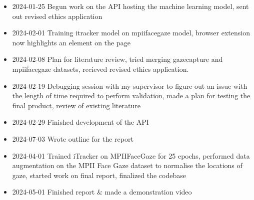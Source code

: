 \documentclass{report}
\begin{document}
\begin{itemize}
    \item 2024-01-25 Begun work on the API hosting the machine learning model, sent out revised ethics application 
    \item 2024-02-01 Training itracker model on mpiifacegaze model, browser extension now highlights an element on the page 
    \item 2024-02-08 Plan for literature review, tried merging gazecapture and mpiifacegaze datasets, recieved revised ethics application. 
    \item 2024-02-19 Debugging session with my supervisor to figure out an issue with the length of time required to perform validation, made a plan for testing the final product, review of existing literature 
    \item 2024-02-29 Finished development of the API 
    \item 2024-07-03 Wrote outline for the report
    \item 2024-04-01 Trained iTracker on MPIIFaceGaze for 25 epochs, performed data augmentation on the MPII Face Gaze dataset to normalise the locations of gaze, started work on final report, finalized the codebase 
    \item 2024-05-01 Finished report \& made a demonstration video 
    
\end{itemize}
\end{document}
